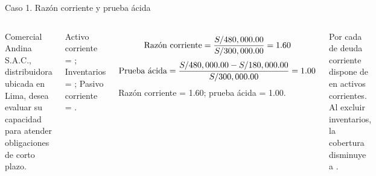 \begin{frame}{Caso 1. Razón corriente y prueba ácida}
\smallcase
\begin{columns}[T,totalwidth=\textwidth]
 Comercial Andina S.A.C., distribuidora ubicada en Lima, desea evaluar su capacidad para atender obligaciones de corto plazo.

Activo corriente = ; Inventarios = ; Pasivo corriente = .

\[
\text{Razón corriente}=\frac{S/ 480,000.00}{S/ 300,000.00}=1.60
\]
\[
\text{Prueba ácida}=\frac{S/ 480,000.00-S/ 180,000.00}{S/ 300,000.00}=1.00
\]
 Razón corriente = 1.60; prueba ácida = 1.00.

 Por cada  de deuda corriente dispone de  en activos corrientes. Al excluir inventarios, la cobertura disminuye a .

\centering
{}
\end{columns}
\end{frame}

